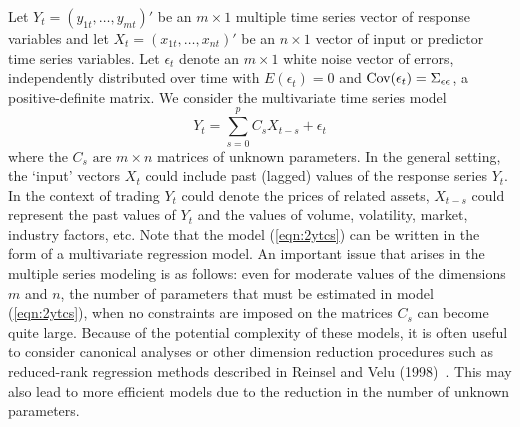 Let $Y_t=(y_{1t},\ldots, y_{mt})'$ be an $m \times 1$ multiple time series vector of response variables and let $X_t=(x_{1t}, \ldots, x_{nt})'$ be an $n \times 1$ vector of input or predictor time series variables. Let $\epsilon_t$ denote an $m \times 1$ white noise vector of errors, independently distributed over time with $E(\epsilon_t)=0$ and $\operatorname{Cov}(\epsilon_t)=\Sigma_{\epsilon\epsilon}$, a positive-definite matrix. We consider the multivariate time series model
	\begin{equation}\label{eqn:2ytcs}
	Y_{t} = \sum_{s=0}^{p}C_sX_{t-s}+\epsilon_t 
	\end{equation}
where the $C_s \text{ are } m\times n$ matrices of unknown parameters. In the general setting, the `input' vectors $X_t$ could include past (lagged) values of the response series $Y_t$. In the context of trading $Y_t$ could denote the prices of related assets, $X_{t-s}$ could represent the past values of $Y_t$ and the values of volume, volatility, market, industry factors, etc. Note that the model (\ref{eqn:2ytcs}) can be written in the form of a multivariate regression model. An important issue that arises in the multiple series modeling is as follows: even for moderate values of the dimensions $m$ and $n$, the number of parameters that must be estimated in model (\ref{eqn:2ytcs}), when no constraints are imposed on the matrices $C_s$ can become quite large. Because of the potential complexity of these models, it is often useful to consider canonical analyses or other dimension reduction procedures such as reduced-rank regression methods described in Reinsel and Velu (1998)~\cite{velurein}. This may also lead to more efficient models due to the reduction in the number of unknown parameters.


